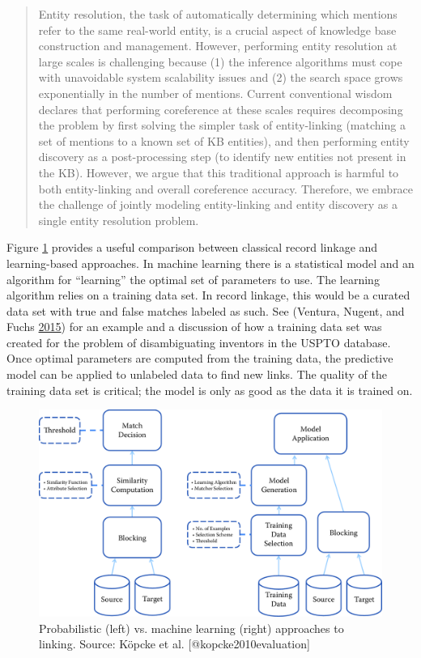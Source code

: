 \documentclass[]{krantz}
\begin{document}
\begin{quote}
Entity resolution, the task of automatically determining which mentions
refer to the same real-world entity, is a crucial aspect of knowledge
base construction and management. However, performing entity resolution
at large scales is challenging because (1) the inference algorithms must
cope with unavoidable system scalability issues and (2) the search space
grows exponentially in the number of mentions. Current conventional
wisdom declares that performing coreference at these scales requires
decomposing the problem by first solving the simpler task of
entity-linking (matching a set of mentions to a known set of KB
entities), and then performing entity discovery as a post-processing
step (to identify new entities not present in the KB). However, we argue
that this traditional approach is harmful to both entity-linking and
overall coreference accuracy. Therefore, we embrace the challenge of
jointly modeling entity-linking and entity discovery as a single entity
resolution problem.
\end{quote}

Figure \ref{fig:fig3-2} provides a useful comparison between classical
record linkage and learning-based approaches. In machine learning there
is a statistical model and an algorithm for ``learning'' the optimal set
of parameters to use. The learning algorithm relies on a training data
set. In record linkage, this would be a curated data set with true and
false matches labeled as such. See (Ventura, Nugent, and Fuchs
\protect\hyperlink{ref-ventura2015seeing}{2015}) for an example and a
discussion of how a training data set was created for the problem of
disambiguating inventors in the USPTO database. Once optimal parameters
are computed from the training data, the predictive model can be applied
to unlabeled data to find new links. The quality of the training data
set is critical; the model is only as good as the data it is trained on.

\begin{figure}

{\centering \includegraphics[width=0.7\linewidth]{ChapterLinkage/figures/fig3-2} 

}

\caption{Probabilistic (left) vs. machine learning (right) approaches to linking. Source: Köpcke et al. [@kopcke2010evaluation]}\label{fig:fig3-2}
\end{figure}
\end{document}
